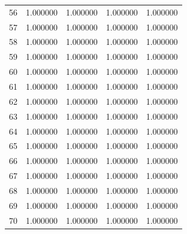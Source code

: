 \begin{tabular}{lrrrr}
56 & 1.000000 & 1.000000 & 1.000000 & 1.000000 \\
57 & 1.000000 & 1.000000 & 1.000000 & 1.000000 \\
58 & 1.000000 & 1.000000 & 1.000000 & 1.000000 \\
59 & 1.000000 & 1.000000 & 1.000000 & 1.000000 \\
60 & 1.000000 & 1.000000 & 1.000000 & 1.000000 \\
61 & 1.000000 & 1.000000 & 1.000000 & 1.000000 \\
62 & 1.000000 & 1.000000 & 1.000000 & 1.000000 \\
63 & 1.000000 & 1.000000 & 1.000000 & 1.000000 \\
64 & 1.000000 & 1.000000 & 1.000000 & 1.000000 \\
65 & 1.000000 & 1.000000 & 1.000000 & 1.000000 \\
66 & 1.000000 & 1.000000 & 1.000000 & 1.000000 \\
67 & 1.000000 & 1.000000 & 1.000000 & 1.000000 \\
68 & 1.000000 & 1.000000 & 1.000000 & 1.000000 \\
69 & 1.000000 & 1.000000 & 1.000000 & 1.000000 \\
70 & 1.000000 & 1.000000 & 1.000000 & 1.000000 \\
\bottomrule
\end{tabular}

